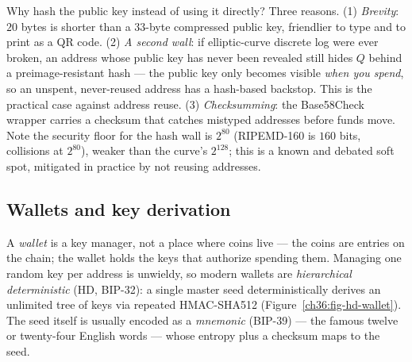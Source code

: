 \begin{whybox}
Why hash the public key instead of using it directly? Three reasons. (1) \emph{Brevity}: $20$ bytes is shorter than a $33$-byte compressed public key, friendlier to type and to print as a QR code. (2) \emph{A second wall}: if elliptic-curve discrete log were ever broken, an address whose public key has never been revealed still hides $Q$ behind a preimage-resistant hash --- the public key only becomes visible \emph{when you spend}, so an unspent, never-reused address has a hash-based backstop. This is the practical case against address reuse. (3) \emph{Checksumming}: the Base58Check wrapper carries a checksum that catches mistyped addresses before funds move. Note the security floor for the hash wall is $2^{80}$ (RIPEMD-160 is $160$ bits, collisions at $2^{80}$), weaker than the curve's $2^{128}$; this is a known and debated soft spot, mitigated in practice by not reusing addresses.
\end{whybox}

\subsection{Wallets and key derivation}
\label{ch36:wallets}

A \emph{wallet} is a key manager, not a place where coins live --- the coins are entries on the chain; the wallet holds the keys that authorize spending them. Managing one random key per address is unwieldy, so modern wallets are \emph{hierarchical deterministic} (HD, BIP-32): a single master seed deterministically derives an unlimited tree of keys via repeated HMAC-SHA512 (Figure~\ref{ch36:fig-hd-wallet}). The seed itself is usually encoded as a \emph{mnemonic} (BIP-39) --- the famous twelve or twenty-four English words --- whose entropy plus a checksum maps to the seed.

